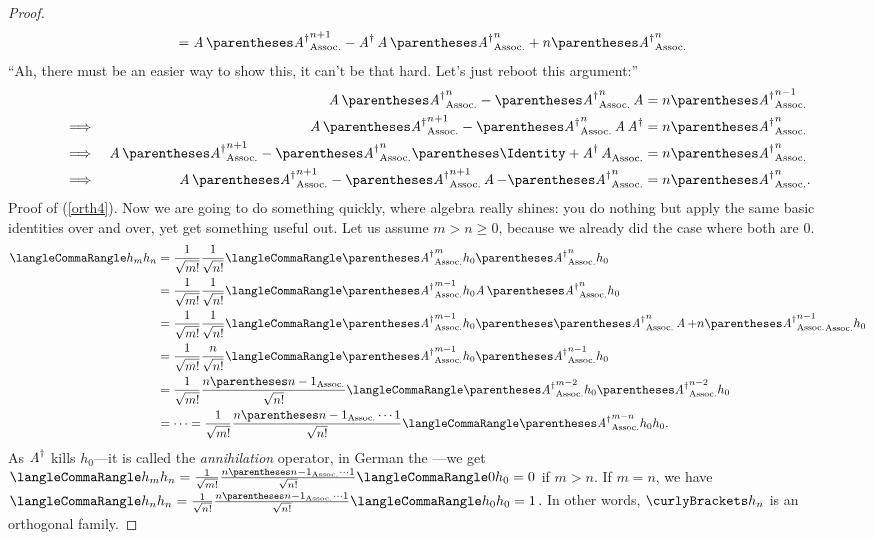 \documentclass[10pt, a4paper, twoside]{lecturenotes}
\newcommand{\opAdag}{\adj{\opA}}
\begin{document}
\begin{lecture}[date=2013-03-28]
\begin{proposition}
\begin{proof}
\begin{align*}
  &= \opA \pa{\opAdag}^{n+1} - \opAdag \opA \pa{\opAdag}^n + n \pa{\opAdag}^n
\end{align*}
  ``Ah, there must be an easier way to show this, it can't be that hard. Let's just reboot this argument:''
\begin{alignat*}{2}
&& \opA\pa{\opAdag}^n - \pa{\opAdag}^n\opA &= n \pa{\opAdag}^{n-1}\\
\Implies&& \opA\pa{\opAdag}^{n+1} - \pa{\opAdag}^n \opA \opAdag &= n \pa{\opAdag}^n \\
\Implies&& \opA \pa{\opAdag}^{n+1} - \pa{\opAdag}^n \pa{\Identity + \opAdag\opA}&= n \pa{\opAdag}^n \\
\Implies&& \opA \pa{\opAdag}^{n+1} - \pa{\opAdag}^{n+1} \opA - \pa{\opAdag}^{n} &= n \pa{\opAdag}^n \text.
\end{alignat*}
Proof of (\ref{orth4}). Now we are going to do something quickly, where algebra really shines: you do nothing but apply the same basic identities over and over, yet get something useful out. Let us assume $m>n\geq 0$, because we already did the case where both are $0$.
\begin{align*}
\LTwoInner{h_m}{h_n} &= \frac{1}{\sqrt{\Factorial m}} \frac{1}{\sqrt{\Factorial n}} \LTwoInner{\pa{\opAdag}^{m} h_0}{\pa{\opAdag}^{n} h_0} \\
&= \frac{1}{\sqrt{\Factorial m}} \frac{1}{\sqrt{\Factorial n}}\LTwoInner{\pa{\opAdag}^{m-1} h_0}{\opA\pa{\opAdag}^{n} h_0}\\
&= \frac{1}{\sqrt{\Factorial m}} \frac{1}{\sqrt{\Factorial n}}\LTwoInner{\pa{\opAdag}^{m-1} h_0}{\pa{\pa{\opAdag}^{n}\opA + n\pa{\opAdag}^{n-1}} h_0 }\\
&= \frac{1}{\sqrt{\Factorial m}} \frac{n}{\sqrt{\Factorial n}} 
  \LTwoInner{\pa{\opAdag}^{m-1} h_0}{\pa{\opAdag}^{n-1} h_0}\\
&= \frac{1}{\sqrt{\Factorial m}} 
  \frac{n\pa{n-1}}{\sqrt{\Factorial n}} 
  \LTwoInner{\pa{\opAdag}^{m-2} h_0}{\pa{\opAdag}^{n-2} h_0}\\
  &= \dotsb = \frac{1}{\sqrt{\Factorial m}} 
  \frac{n\pa{n-1}\dotsm 1}{\sqrt{\Factorial n}} 
  \LTwoInner{\pa{\opAdag}^{m-n} h_0}{h_0}\text.
\end{align*}
As $\opAdag$ kills $h_0$---it is called the \emph{annihilation} operator, in German the ---we get $
  \LTwoInner{h_m}{h_n} =
  \frac{1}{\sqrt{\Factorial m}} 
  \frac{n\pa{n-1}\dotsm 1}{\sqrt{\Factorial n}} 
  \LTwoInner{0}{h_0}=0$ if $m>n$. If $m=n$, we have $
  \LTwoInner{h_n}{h_n} =
  \frac{1}{\sqrt{\Factorial n}} 
  \frac{n\pa{n-1}\dotsm 1}{\sqrt{\Factorial n}} 
  \LTwoInner{h_0}{h_0}=1$.  
  In other words, $\set{h_n}$ is an orthogonal family.


\end{proof}
\end{proposition}
\end{lecture}
\end{document}
